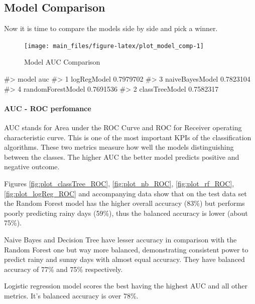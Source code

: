 \hypertarget{model-comparison}{%
\subsection{Model Comparison}\label{model-comparison}}

Now it is time to compare the models side by side and pick a winner.

\begin{Schunk}
\begin{figure}[H]

{\centering \texttt{[image: main\_files/figure-latex/plot\_model\_comp-1]} 

}

\caption[Model AUC Comparison]{Model AUC Comparison}\label{fig:plot_model_comp}
\end{figure}
\begin{Soutput}
#>               model       auc
#> 1       logRegModel 0.7979702
#> 3   naiveBayesModel 0.7823104
#> 4 randomForestModel 0.7691536
#> 2    classTreeModel 0.7582317
\end{Soutput}
\end{Schunk}

\hypertarget{auc---roc-perfomance}{%
\paragraph{AUC - ROC perfomance}\label{auc---roc-perfomance}}

AUC stands for Area under the ROC Curve and ROC for Receiver operating
characteristic curve. This is one of the most important KPIs of the
classification algorithms. These two metrics measure how well the models
distinguishing between the classes. The higher AUC the better model
predicts positive and negative outcome.

Figures \ref{fig:plot_classTree_ROC}, \ref{fig:plot_nb_ROC},
\ref{fig:plot_rf_ROC}, \ref{fig:plot_logReg_ROC} and accompanying data
show that on the test data set the Random Forest model has the higher
overall accuracy (83\%) but performs poorly predicting rainy days
(59\%), thus the balanced accuracy is lower (about 75\%).

Naive Bayes and Decision Tree have lesser accuracy in comparison with
the Random Forest one but way more balanced, demonstrating consistent
power to predict rainy and sunny days with almost equal accuracy. They
have balanced accuracy of 77\% and 75\% respectively.

Logistic regression model scores the best having the highest AUC and all
other metrics. It's balanced accuracy is over 78\%.

